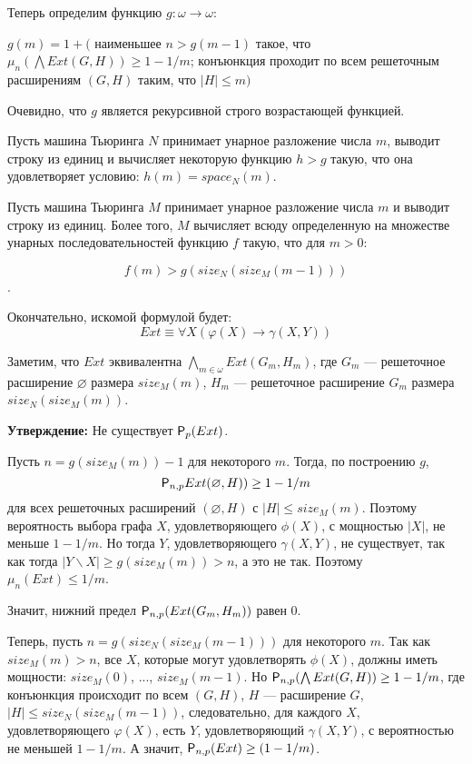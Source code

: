 \documentclass{article}
\begin{document}
Теперь определим функцию $g: \omega \rightarrow \omega$:

$g(m) = 1 + ($ наименьшее $n > g(m-1)$ такое, что $\mu_n(\bigwedge Ext(G, H)) \geq 1 - 1/m$; конъюнкция проходит по всем решеточным расширениям $(G, H)$ таким, что $|H| \leq m)$

Очевидно, что $g$ является рекурсивной строго возрастающей функцией.

Пусть машина Тьюринга $N$ принимает унарное разложение числа $m$, выводит строку из единиц и вычисляет некоторую функцию $h > g$ такую, что она удовлетворяет условию: $h(m) = space_N (m)$.

Пусть машина Тьюринга $M$ принимает унарное разложение числа $m$ и выводит строку из единиц. Более того, $M$ вычисляет всюду определенную на множестве унарных последовательностей функцию $f$ такую, что для $m> 0$:

$$f(m) > g(size_N(size_M(m-1)))$$.

Окончательно, искомой формулой будет:
$$Ext \equiv \forall X (\varphi (X) \rightarrow \gamma (X, Y)) $$

Заметим, что $Ext$ эквивалентна $\bigwedge_{m \in \omega} Ext (G_m, H_m)$, где $G_m$ --- решеточное расширение $\varnothing$ размера $size_M (m)$, $H_m$ --- решеточное расширение $G_m$ размера $size_N (size_M(m))$.

{\bf Утверждение:} Не существует ${\sf P}_{p}(Ext)$.

Пусть $n = g(size_M (m)) - 1$ для некоторого $m$. Тогда, по построению $g$,
$${\sf P}_{n, p} Ext(\varnothing, H)) \geq 1 - 1/m$$
для всех решеточных расширений $(\varnothing, H)$ с $|H| \leq size_M(m)$. Поэтому вероятность выбора графа $X$, удовлетворяющего $\phi(X)$, с мощностью $|X|$, не меньше $1-1/m$. Но тогда $Y$, удовлетворяющего $\gamma (X, Y)$, не существует, так как тогда $|Y \backslash X| \geq g(size_M (m)) > n$, а это не так. Поэтому $\mu_n (Ext) \leq 1/m$.

Значит, нижний предел ${\sf P}_{n, p}(Ext(G_m, H_m))$ равен 0.

Теперь, пусть $n = g(size_N(size_M(m-1)))$ для некоторого $m$. Так как $size_M(m) > n$, все $X$, которые могут удовлетворять $\phi(X)$, должны иметь мощности: $size_M(0)$, ..., $size_M(m-1)$. Но ${\sf P}_{n, p}(\bigwedge Ext (G, H) ) \geq 1 - 1/m$, где конъюнкция происходит по всем $(G, H)$, $H$ --- расширение $G$, $|H| \leq size_N(size_M(m-1))$, следовательно, для каждого $X$, удовлетворяющего $\varphi(X)$, есть $Y$, удовлетворяющий $\gamma(X,Y)$, с вероятностью не меньшей $1-1/m$. А значит, ${\sf P}_{n, p}(Ext) \geq (1- 1/m)$.
\end{document}
